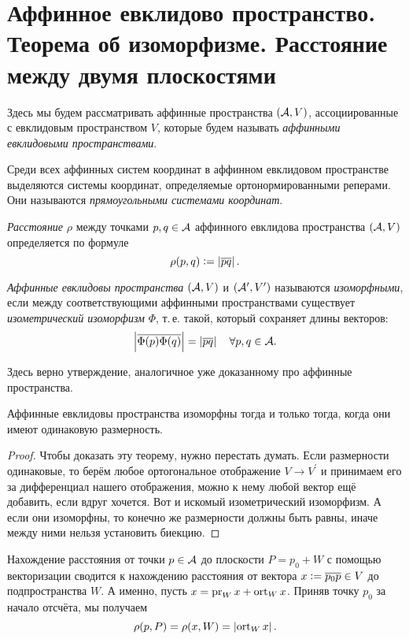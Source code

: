 \section{Аффинное евклидово пространство. Теорема об изоморфизме. Расстояние между двумя
плоскостями}

Здесь мы будем рассматривать аффинные пространства $(\mathcal{A}, V)$, ассоциированные с евклидовым пространством $V$, которые будем называть \textit{аффинными евклидовыми пространствами}.

Среди всех аффинных систем координат в аффинном евклидовом пространстве выделяются системы координат, определяемые ортонормированными реперами. Они называются \textit{прямоугольными системами координат}.

\begin{definition}
    \textit{Расстояние} $\rho$ между точками $p, q \in \mathcal{A}$ аффинного евклидова пространства $(\mathcal{A}, V)$ определяется по формуле
    \[
        \rho(p, q) \vcentcolon = \left\lvert\overline{pq}\right\rvert.
    \]
\end{definition}

\begin{definition}
    \textit{Аффинные евклидовы пространства} $(\mathcal{A}, V)$ и $(\mathcal{A}^\prime, V^\prime)$ называются \textit{изоморфными}, если между соответствующими аффинными пространствами существует \textit{изометрический изоморфизм} $\Phi$, т.\,е. такой, который сохраняет длины векторов:
    \[
        \left\lvert\overline{\Phi(p)\Phi(q)}\right\rvert = \left\lvert\overline{pq}\right\rvert\quad\forall p, q \in \mathcal{A}.
    \]
\end{definition}

Здесь верно утверждение, аналогичное уже доказанному про аффинные пространства.

\begin{theorem}[Об изоморфизме]
    Аффинные евклидовы пространства изоморфны тогда и только тогда, когда они имеют одинаковую размерность.
\end{theorem}

\begin{proof}
    Чтобы доказать эту теорему, нужно перестать думать. Если размерности одинаковые, то берём любое ортогональное отображение $V \to V^\prime$ и принимаем его за дифференциал нашего отображения, можно к нему любой вектор ещё добавить, если вдруг хочется. Вот и искомый изометрический изоморфизм. А если они изоморфны, то конечно же размерности должны быть равны, иначе между ними нельзя установить биекцию.
\end{proof}

Нахождение расстояния от точки $p \in \mathcal{A}$ до плоскости $P = p_0 + W$ с помощью векторизации сводится к нахождению расстояния от вектора $x \vcentcolon = \overline{p_0p} \in V$ до подпространства $W$. А именно, пусть $x = \operatorname{pr}_Wx + \operatorname{ort}_Wx$. Приняв точку $p_0$ за начало отсчёта, мы получаем
\[
    \rho(p, P) = \rho(x, W) = \left\lvert\operatorname{ort}_Wx\right\rvert.
\]

